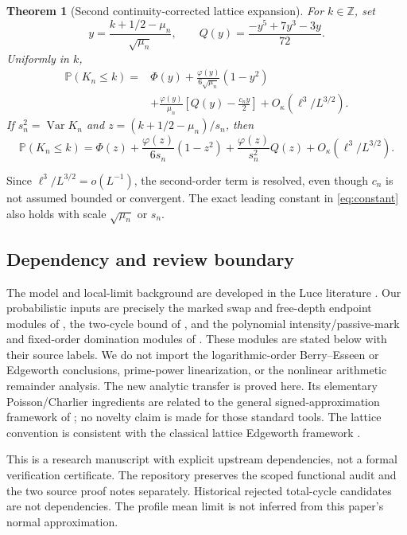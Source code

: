 \documentclass[11pt]{article}
\newcommand{\Pp}{\mathbb P}
\newcommand{\Var}{\operatorname{Var}}
\newtheorem{theorem}{Theorem}[section]
\theoremstyle{remark}
\begin{document}
\begin{theorem}[Second continuity-corrected lattice expansion]\label{thm:second}
For $k\in\mathbb Z$, set
\[
 y=\frac{k+1/2-\mu_n}{\sqrt{\mu_n}},\qquad Q(y)=\frac{-y^5+7y^3-3y}{72}.
\]
Uniformly in $k$,
\begin{equation}\label{eq:second}
\begin{split}
 \Pp(K_n\le k)={}&\Phi(y)+\frac{\varphi(y)}{6\sqrt{\mu_n}}(1-y^2)\\
 &+\frac{\varphi(y)}{\mu_n}\left[Q(y)-\frac{c_ny}{2}\right]
 +O_\kappa(\ell^3/L^{3/2}).
\end{split}
\end{equation}
If $s_n^2=\Var K_n$ and $z=(k+1/2-\mu_n)/s_n$, then
\begin{equation}\label{eq:variance-scaled}
 \Pp(K_n\le k)=\Phi(z)+\frac{\varphi(z)}{6s_n}(1-z^2)
 +\frac{\varphi(z)}{s_n^2}Q(z)+O_\kappa(\ell^3/L^{3/2}).
\end{equation}
\end{theorem}
Since $\ell^3/L^{3/2}=o(L^{-1})$, the second-order term is resolved, even though $c_n$ is not assumed bounded or convergent. The exact leading constant in \eqref{eq:constant} also holds with scale $\sqrt{\mu_n}$ or $s_n$.

\subsection*{Dependency and review boundary}
The model and local-limit background are developed in the Luce literature \cite{CDK,BCD}. Our probabilistic inputs are precisely the marked swap and free-depth endpoint modules of \cite{Switch}, the two-cycle bound of \cite{Order}, and the polynomial intensity/passive-mark and fixed-order domination modules of \cite{OrderQuant}. These modules are stated below with their source labels. We do not import the logarithmic-order Berry--Esseen or Edgeworth conclusions, prime-power linearization, or the nonlinear arithmetic remainder analysis. The new analytic transfer is proved here. Its elementary Poisson/Charlier ingredients are related to the general signed-approximation framework of \cite{BKN}; no novelty claim is made for those standard tools. The lattice convention is consistent with the classical lattice Edgeworth framework \cite{KM}.

This is a research manuscript with explicit upstream dependencies, not a formal verification certificate. The repository preserves the scoped functional audit and the two source proof notes separately. Historical rejected total-cycle candidates are not dependencies. The profile mean limit is not inferred from this paper's normal approximation.
\end{document}
